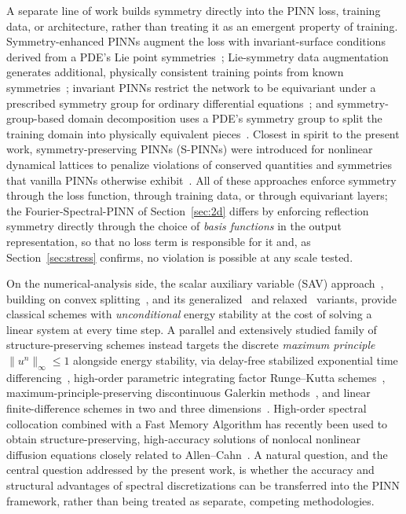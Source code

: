 \documentclass[symmetry,article,submit,moreauthors]{Definitions/mdpi}
\begin{document}
A separate line of work builds symmetry directly into the PINN loss, training data, or architecture, rather than treating it as an emergent property of training. Symmetry-enhanced PINNs augment the loss with invariant-surface conditions derived from a PDE's Lie point symmetries~\cite{Zhang_SPINN2023,Zhang_SymGroup2023}; Lie-symmetry data augmentation generates additional, physically consistent training points from known symmetries~\cite{Brandstetter2022}; invariant PINNs restrict the network to be equivariant under a prescribed symmetry group for ordinary differential equations~\cite{Arora2024}; and symmetry-group-based domain decomposition uses a PDE's symmetry group to split the training domain into physically equivalent pieces~\cite{Liu_SymDD2024}. Closest in spirit to the present work, symmetry-preserving PINNs (S-PINNs) were introduced for nonlinear dynamical lattices to penalize violations of conserved quantities and symmetries that vanilla PINNs otherwise exhibit~\cite{Zhu_SPINN2022}. All of these approaches enforce symmetry through the loss function, through training data, or through equivariant layers; the Fourier-Spectral-PINN of Section~\ref{sec:2d} differs by enforcing reflection symmetry directly through the choice of \emph{basis functions} in the output representation, so that no loss term is responsible for it and, as Section~\ref{sec:stress} confirms, no violation is possible at any scale tested.

On the numerical-analysis side, the scalar auxiliary variable (SAV) approach~\cite{Shen_SAV}, building on convex splitting~\cite{Eyre}, and its generalized~\cite{Huang_GSAV} and relaxed~\cite{Jiang_RSAV} variants, provide classical schemes with \emph{unconditional} energy stability at the cost of solving a linear system at every time step. A parallel and extensively studied family of structure-preserving schemes instead targets the discrete \emph{maximum principle} $\|u^n\|_\infty\le1$ alongside energy stability, via delay-free stabilized exponential time differencing~\cite{Zhang_ETD2024}, high-order parametric integrating factor Runge--Kutta schemes~\cite{Gao_pIFRK2023}, maximum-principle-preserving discontinuous Galerkin methods~\cite{Du_MPPDG2022}, and linear finite-difference schemes in two and three dimensions~\cite{Feng_MPPFD2021,Kim_MPP3D2025}. High-order spectral collocation combined with a Fast Memory Algorithm has recently been used to obtain structure-preserving, high-accuracy solutions of nonlocal nonlinear diffusion equations closely related to Allen--Cahn~\cite{Shiyapov2026}. A natural question, and the central question addressed by the present work, is whether the accuracy and structural advantages of spectral discretizations can be transferred into the PINN framework, rather than being treated as separate, competing methodologies.
\end{document}
